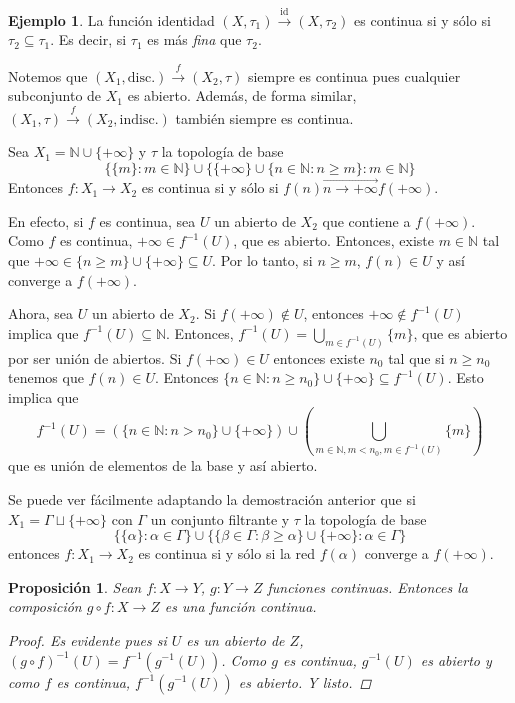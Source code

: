 \documentclass[12pt]{book}
\newtheorem{prop}[teo]{Proposición}
\theoremstyle{definition}
\newtheorem{ex}[teo]{Ejemplo}
\newcommand{\NN}{\mathbb{N}}
\DeclareMathOperator{\id}{id}
\begin{document}
\begin{ex}
La función identidad $(X,\tau_1)\stackrel{\id}{\longrightarrow} (X,\tau_2)$ es continua si y sólo si $\tau_2\subseteq \tau_1$. Es decir, si $\tau_1$ es más \textit{fina} que $\tau_2$.

Notemos que $(X_1,\mathrm{disc.})\stackrel{f}{\longrightarrow} (X_2,\tau)$ siempre es continua pues cualquier subconjunto de $X_1$ es abierto. Además, de forma similar, $(X_1,\tau)\stackrel{f}{\longrightarrow} (X_2,\mathrm{indisc.})$ también siempre es continua.

Sea $X_1 = \NN\cup\{+\infty\}$ y $\tau$ la topología de base $$\{\{m\}: m\in\NN\} \cup \{\{+\infty\}\cup \{n\in\NN : n\geq m\} : m\in\NN\}$$ Entonces $f:X_1\to X_2$ es continua si y sólo si $f(n)\stackrel{\longrightarrow}{n\to +\infty} f(+\infty)$.

En efecto, si $f$ es continua, sea $U$ un abierto de $X_2$ que contiene a $f(+\infty)$. Como $f$ es continua, $+\infty\in f^{-1}(U)$, que es abierto. Entonces, existe $m\in\NN$ tal que $+\infty \in \{n\geq m\}\cup \{+\infty\}\subseteq U$. Por lo tanto, si $n\geq m$, $f(n)\in U$ y así converge a $f(+\infty)$.

Ahora, sea $U$ un abierto de $X_2$. Si $f(+\infty)\notin U$, entonces $+\infty\notin f^{-1}(U)$ implica que $f^{-1}(U)\subseteq \NN$. Entonces, $f^{-1}(U) = \displaystyle\bigcup_{m\in f^{-1}(U)}\{m\}$, que es abierto por ser unión de abiertos. Si $f(+\infty)\in U$ entonces existe $n_0$ tal que si $n\geq n_0$ tenemos que $f(n)\in U$. Entonces $\{n\in\NN : n\geq n_0\}\cup \{+\infty\}\subseteq f^{-1}(U)$. Esto implica que $$f^{-1}(U) = (\{n\in\NN : n> n_0\}\cup\{+\infty\}) \cup \left(\displaystyle\bigcup_{m\in\NN, m<n_0, m\in f^{-1}(U)}\{m\}\right)$$ que es unión de elementos de la base y así abierto.

Se puede ver fácilmente adaptando la demostración anterior que si $X_1 = \Gamma \sqcup \{+\infty\}$ con $\Gamma$ un conjunto filtrante y $\tau$ la topología de base $$\{\{\alpha\} : \alpha\in \Gamma\} \cup \{\{\beta\in\Gamma : \beta\geq \alpha\}\cup\{+\infty\} : \alpha\in\Gamma\}$$ entonces $f:X_1\to X_2$ es continua si y sólo si la red $f(\alpha)$ converge a $f(+\infty)$.
\end{ex}

\begin{prop}
Sean $f:X\to Y$, $g:Y\to Z$ funciones continuas. Entonces la composición $g\circ f:X\to Z$ es una función continua.
\begin{proof}
Es evidente pues si $U$ es un abierto de $Z$, $(g\circ f)^{-1}(U) = f^{-1}(g^{-1}(U))$. Como $g$ es continua, $g^{-1}(U)$ es abierto y como $f$ es continua, $f^{-1}(g^{-1}(U))$ es abierto. Y listo.
\end{proof}
\end{prop}
\end{document}
